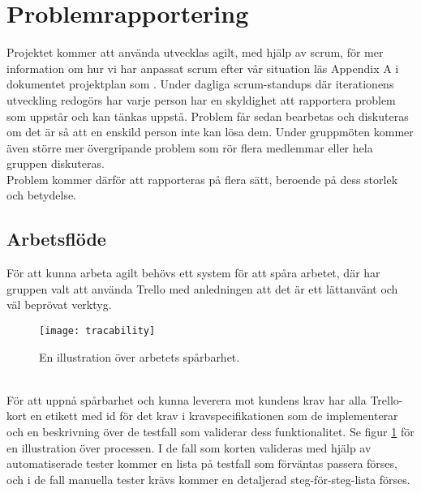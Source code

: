 \section{Problemrapportering}
Projektet kommer att använda utvecklas agilt, med hjälp av scrum, för mer information om hur vi har anpassat scrum efter vår situation läs Appendix A i dokumentet projektplan som . Under dagliga scrum-standups där iterationens utveckling redogörs har varje person har en skyldighet att rapportera problem som uppstår och kan tänkas uppstå. Problem får sedan bearbetas och diskuteras om det är så att en enskild person inte kan lösa dem. Under gruppmöten kommer även större mer övergripande problem som rör flera medlemmar eller hela gruppen diskuteras. \\
Problem kommer därför att rapporteras på flera sätt, beroende på dess storlek och betydelse.
\subsection{Arbetsflöde}
För att kunna arbeta agilt behövs ett system för att spåra arbetet, där har gruppen valt att använda Trello\cite{website:trello} med anledningen att det är ett lättanvänt och väl beprövat verktyg.
\begin{figure}[h]
\begin{center}
\texttt{[image: tracability]}
\caption{En illustration över arbetets spårbarhet.}
\label{fig:tracability}
\end{center}
\end{figure}
\\
För att uppnå spårbarhet och kunna leverera mot kundens krav har alla Trello-kort en etikett med id för det krav i kravspecifikationen som de implementerar och en beskrivning över de testfall som validerar dess funktionalitet. Se figur \ref{fig:tracability} för en illustration över processen.
I de fall som korten valideras med hjälp av automatiserade tester kommer en lista på testfall som förväntas passera förses, och i de fall manuella tester krävs kommer en detaljerad steg-för-steg-lista förses.
